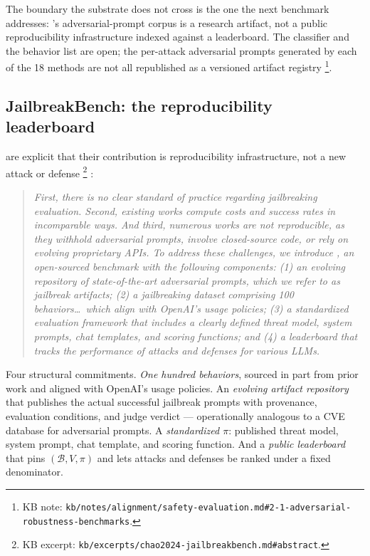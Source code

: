 The boundary the substrate does not cross is the one the next
benchmark addresses: 's adversarial-prompt corpus is a
research artifact, not a public reproducibility infrastructure
indexed against a leaderboard. The  classifier and
the behavior list are open; the per-attack adversarial prompts
generated by each of the 18 methods are not all republished as a
versioned artifact registry%
\footnote{KB note: \nolinkurl{kb/notes/alignment/safety-evaluation.md#2-1-adversarial-robustness-benchmarks}.}.

\subsection{JailbreakBench: the reproducibility leaderboard}
\label{sec:safety-jailbreakbench}

\citet{chao2024-jailbreakbench} are explicit that their
contribution is reproducibility infrastructure, not a new attack or
defense%
\footnote{KB excerpt: \nolinkurl{kb/excerpts/chao2024-jailbreakbench.md#abstract}.}
\citep[\S{}abstract]{chao2024-jailbreakbench}:

\begin{quote}\itshape
First, there is no clear standard of practice regarding
jailbreaking evaluation. Second, existing works compute costs and
success rates in incomparable ways. And third, numerous works are
not reproducible, as they withhold adversarial prompts, involve
closed-source code, or rely on evolving proprietary APIs. To
address these challenges, we introduce , an
open-sourced benchmark with the following components: (1) an
evolving repository of state-of-the-art adversarial prompts, which
we refer to as jailbreak artifacts; (2) a jailbreaking dataset
comprising 100 behaviors\ldots\ which align with OpenAI's usage
policies; (3) a standardized evaluation framework that includes a
clearly defined threat model, system prompts, chat templates, and
scoring functions; and (4) a leaderboard that tracks the performance
of attacks and defenses for various LLMs.
\end{quote}

Four structural commitments. \emph{One hundred behaviors}, sourced
in part from prior work \citep{harmbench2024} and aligned with
OpenAI's usage policies. An \emph{evolving artifact repository}
that publishes the actual successful jailbreak prompts with
provenance, evaluation conditions, and judge verdict ---
operationally analogous to a CVE database for adversarial prompts.
A \emph{standardized $\pi$}: published threat model, system prompt,
chat template, and scoring function. And a \emph{public
leaderboard} that pins $(\mathcal{B}, V, \pi)$ and lets attacks and
defenses be ranked under a fixed denominator.


